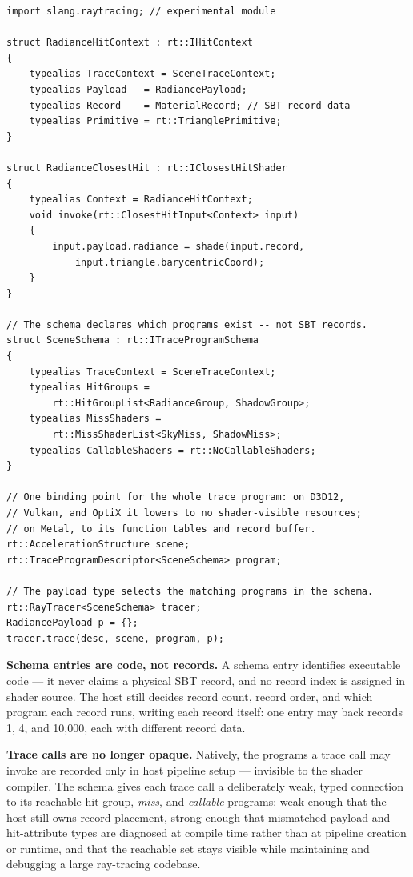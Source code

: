 \documentclass[sigconf,nonacm]{acmart}
\begin{document}
\begin{lstlisting}[float=tb,label={lst:api},caption={The new API surface.
A context fixes the payload, record, and primitive types; the schema
lists which programs exist; one typed descriptor binds the whole trace
program; the trace call is checked against the schema.}]
import slang.raytracing; // experimental module

struct RadianceHitContext : rt::IHitContext
{
    typealias TraceContext = SceneTraceContext;
    typealias Payload   = RadiancePayload;
    typealias Record    = MaterialRecord; // SBT record data
    typealias Primitive = rt::TrianglePrimitive;
}

struct RadianceClosestHit : rt::IClosestHitShader
{
    typealias Context = RadianceHitContext;
    void invoke(rt::ClosestHitInput<Context> input)
    {
        input.payload.radiance = shade(input.record,
            input.triangle.barycentricCoord);
    }
}

// The schema declares which programs exist -- not SBT records.
struct SceneSchema : rt::ITraceProgramSchema
{
    typealias TraceContext = SceneTraceContext;
    typealias HitGroups =
        rt::HitGroupList<RadianceGroup, ShadowGroup>;
    typealias MissShaders =
        rt::MissShaderList<SkyMiss, ShadowMiss>;
    typealias CallableShaders = rt::NoCallableShaders;
}

// One binding point for the whole trace program: on D3D12,
// Vulkan, and OptiX it lowers to no shader-visible resources;
// on Metal, to its function tables and record buffer.
rt::AccelerationStructure scene;
rt::TraceProgramDescriptor<SceneSchema> program;

// The payload type selects the matching programs in the schema.
rt::RayTracer<SceneSchema> tracer;
RadiancePayload p = {};
tracer.trace(desc, scene, program, p);
\end{lstlisting}

\textbf{Schema entries are code, not records.} A schema entry
identifies executable code --- it never claims a physical SBT record,
and no record index is assigned in shader source. The host still
decides record count, record order, and which program each record runs,
writing each record itself: one entry may back records 1, 4, and
10{,}000, each with different record data.

\textbf{Trace calls are no longer opaque.} Natively, the programs a
trace call may invoke are recorded only in host pipeline setup ---
invisible to the shader compiler. The schema gives each trace call a
deliberately weak, typed connection to its reachable hit-group,
\emph{miss}, and \emph{callable} programs: weak enough that the host
still owns record
placement, strong enough that mismatched payload and hit-attribute
types are diagnosed at compile time rather than at pipeline creation or
runtime, and that the reachable set stays visible while maintaining and
debugging a large ray-tracing codebase.
\end{document}
